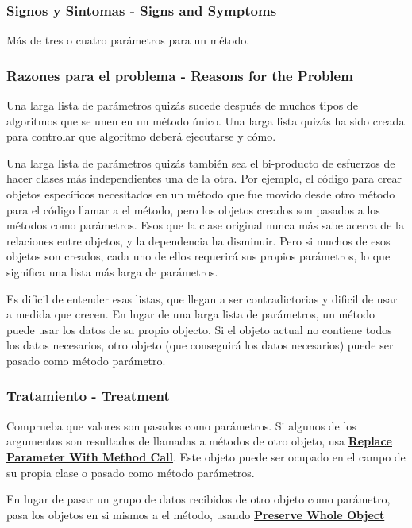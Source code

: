 \documentclass[11pt,a4paper,oneside]{book}
\begin{document}
\subsubsection{Signos y Sintomas - Signs and Symptoms}

Más de tres o cuatro parámetros para un método.




\subsubsection{Razones para el problema - Reasons for the Problem}

Una larga lista de parámetros quizás sucede después de muchos tipos de algoritmos que se unen en un método único. Una larga lista quizás ha sido creada para controlar que algoritmo deberá ejecutarse y cómo.

Una larga lista de parámetros quizás también sea el bi-producto de esfuerzos de hacer clases más independientes una de la otra. Por ejemplo, el código para crear objetos específicos necesitados en un método que fue movido desde otro método para el código llamar a el método, pero los objetos creados son pasados a los métodos como parámetros. Esos que la clase original nunca más sabe acerca de la relaciones entre objetos, y la dependencia ha disminuir. Pero si muchos de esos objetos son creados, cada uno de ellos requerirá sus propios parámetros, lo que significa una lista más larga de parámetros.

Es dificil de entender esas listas, que llegan a ser contradictorias y dificil de usar a medida que crecen. En lugar de una larga lista de parámetros, un método puede usar los datos de su propio objecto. Si el objeto actual no contiene todos los datos necesarios, otro objeto (que conseguirá los datos necesarios) puede ser pasado como método parámetro. 



\subsubsection{Tratamiento - Treatment}

Comprueba que valores son pasados como parámetros. Si algunos de los argumentos son resultados de llamadas a métodos de otro objeto, usa \hyperref[replaceparameterwithmethodcall]{\textbf{Replace Parameter With Method Call}}. Este objeto puede ser ocupado en el campo de su propia clase o pasado como método parámetros.


En lugar de pasar un grupo de datos recibidos de otro objeto como parámetro, pasa los objetos en si mismos a el método, usando \hyperref[preservewholeobject]{\textbf{Preserve Whole Object}}
\end{document}
